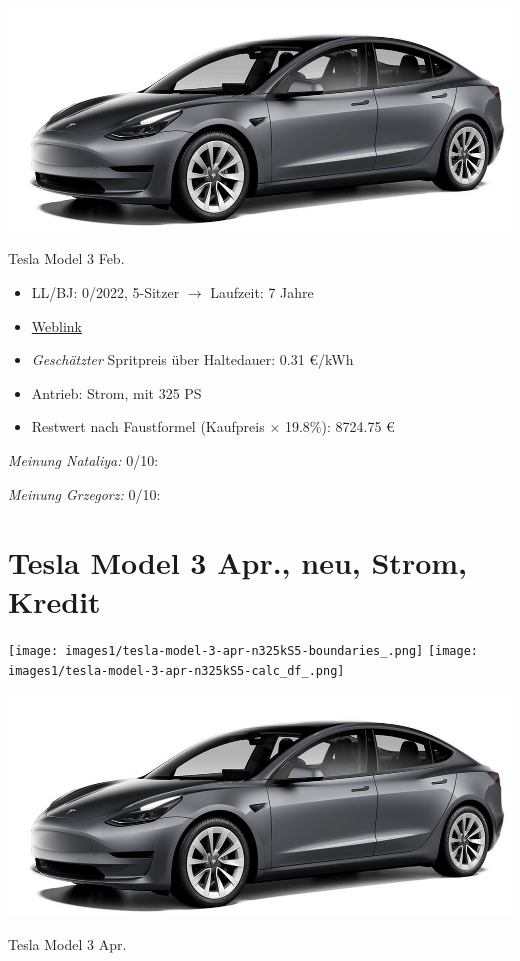 \documentclass[landscape, DIV=99, 14pt]{scrartcl}
\begin{document}
\pagebreak
\begin{center}
\includegraphics[width=0.9\columnwidth]{cars/tesla-model-3.jpg}

Tesla Model 3 Feb.
\end{center}

\begin{itemize}
    \item LL/BJ: 0/2022, 5-Sitzer $\rightarrow$ Laufzeit: 7 Jahre
    \item \href{https://www.tesla.com/de_de/model3/design\#overview}{Weblink}
    \item \emph{Gesch\"atzter} Spritpreis \"uber Haltedauer: 0.31 \euro{}/kWh
    \item Antrieb: Strom, mit 325 PS
    \item Restwert nach Faustformel (Kaufpreis $\times$ 19.8\%): 8724.75 \euro{}
\end{itemize}

\begin{small}
\emph{Meinung Nataliya:} 0/10: 
        
\emph{Meinung Grzegorz:} 0/10: 
\end{small}

\pagebreak


\twocolumn

\section*{Tesla Model 3 Apr., neu, Strom, Kredit}
\begin{center}
\texttt{[image: images1/tesla-model-3-apr-n325kS5-boundaries\_.png]}
\null
\vspace{0.5cm}
\texttt{[image: images1/tesla-model-3-apr-n325kS5-calc\_df\_.png]}
\end{center}

\pagebreak
\begin{center}
\includegraphics[width=0.9\columnwidth]{cars/tesla-model-3.jpg}

Tesla Model 3 Apr.
\end{center}
\end{document}
